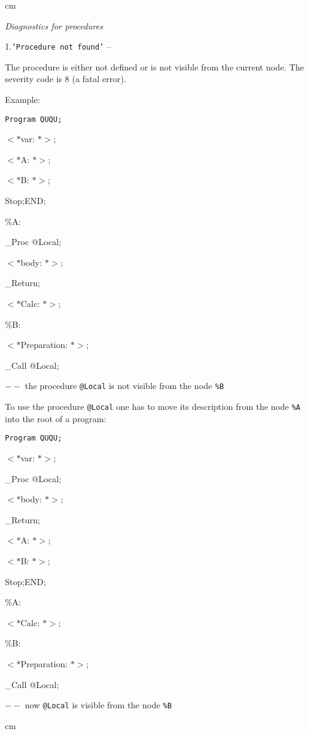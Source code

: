  cm

{\it Diagnostics for procedures}


\item{1.}{\tt 'Procedure not found'} --

The procedure is either not defined or is not visible from the
current node. The severity code is 8 (a fatal error).

       Example:

      {\tt  Program QUQU;

          $<*$var: $*>$;

          $<*$A: $*>$;

          $<*$B: $*>$;

        Stop;END;

        \%A:

          \_Proc @Local;

            $<*$body: $*>$;

          \_Return;

          $<*$Calc: $*>$;

        \%B:

          $<*$Preparation: $*>$;

          \_Call @Local;}

\qquad $--$ the procedure {\tt @Local} is not visible from the node {\tt \%B}

To use the procedure {\tt @Local} one has to move its description
from the node {\tt \%A} into the root of a program:

        {\tt Program QUQU;

        $<*$var: $*>$;

          \_Proc @Local;

            $<*$body: $*>$;

          \_Return;

          $<*$A: $*>$;

          $<*$B: $*>$;

        Stop;END;

        \%A:

          $<*$Calc: $*>$;

        \%B:

          $<*$Preparation: $*>$;

          \_Call @Local;}

\qquad $--$ now {\tt @Local} is visible from the node {\tt \%B}

 cm


